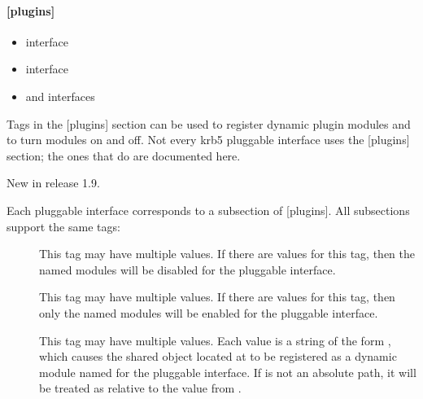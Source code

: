 \documentclass[letterpaper,10pt,english]{sphinxmanual}
\begin{document}
\paragraph{{[}plugins{]}}
\label{\detokenize{admin/conf_files/krb5_conf:id6}}\label{\detokenize{admin/conf_files/krb5_conf:plugins}}\begin{itemize}
\item {} 
{\hyperref[\detokenize{admin/conf_files/krb5_conf:pwqual}]{}} interface

\item {} 
{\hyperref[\detokenize{admin/conf_files/krb5_conf:kadm5-hook}]{}} interface

\item {} 
{\hyperref[\detokenize{admin/conf_files/krb5_conf:clpreauth}]{}} and {\hyperref[\detokenize{admin/conf_files/krb5_conf:kdcpreauth}]{}} interfaces

\end{itemize}

Tags in the {[}plugins{]} section can be used to register dynamic plugin
modules and to turn modules on and off.  Not every krb5 pluggable
interface uses the {[}plugins{]} section; the ones that do are documented
here.

New in release 1.9.

Each pluggable interface corresponds to a subsection of {[}plugins{]}.
All subsections support the same tags:
\begin{description}
\item[{}] \leavevmode
This tag may have multiple values. If there are values for this
tag, then the named modules will be disabled for the pluggable
interface.

\item[{}] \leavevmode
This tag may have multiple values. If there are values for this
tag, then only the named modules will be enabled for the pluggable
interface.

\item[{}] \leavevmode
This tag may have multiple values.  Each value is a string of the
form , which causes the shared object
located at  to be registered as a dynamic module named
 for the pluggable interface.  If  is not an
absolute path, it will be treated as relative to the
 value from {\hyperref[\detokenize{admin/conf_files/krb5_conf:libdefaults}]{}}.

\end{description}
\end{document}
